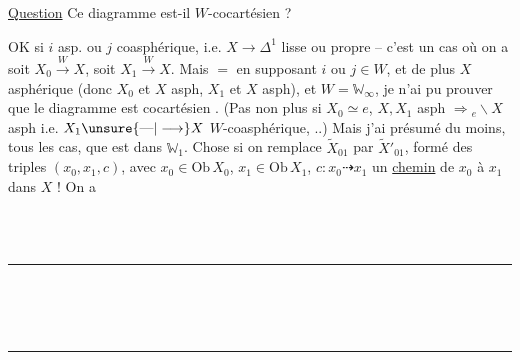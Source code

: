 \uline{Question} Ce diagramme est-il $W$-cocartésien ?

OK si $i$ asp. ou $j$ coasphérique, i.e. $X\longrightarrow\Delta^1$ lisse ou propre -- c’est un cas où on a soit $X_0\xrightarrow{W}X$, soit $X_1\xrightarrow{W}X$. Mais $=$ en supposant $i$ ou $j\in W$, et de plus $X$ asphérique (donc $X_0$ et $X$ asph, $X_1$ et $X$ asph), et $W=\mathbb W_\infty$, je n’ai pu prouver que le diagramme est cocartésien .
(Pas non plus si $X_0\simeq e$, $X,X_1$ asph $\Longrightarrow {}_e\backslash X$ asph i.e. $X_1\unsure{\text{---}|\longrightarrow}X$ $W$-coasphérique, ..) Mais j’ai présumé du moins,  tous les cas, que
 est dans $\mathbb W_1$. \unsure{$\Big]$} Chose   si on remplace $\widetilde X_{01}$ par $\widetilde X'_{01}$, formé des triples $(x_0,x_1,c)$, avec $x_0\in\mathrm{Ob}\,X_0$, $x_1\in\mathrm{Ob}\,X_1$, $c:x_0\dashrightarrow x_1$ un \uline{chemin} de $x_0$ à $x_1$ dans $X$ ! \unsure{$\Big\}$} On a


\noindent\begin{minipage}[t]{.48\linewidth}\centering
{}\\
\\
\rule{2em}{.3pt}\\[.5em]
\\
\\
\rule{2em}{.3pt}\\[.5em]
\\[.5em]
\end{minipage}\hfill
\begin{minipage}[t]{.48\linewidth}
\\[2.5em]
\\
\\
\\[2em]
\end{minipage}


